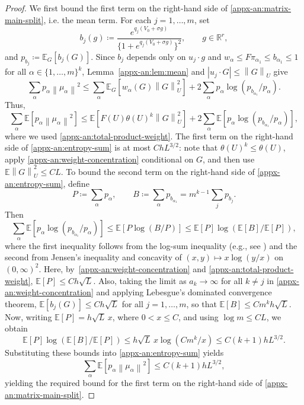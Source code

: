 \documentclass[11pt,letterpaper]{article}
\theoremstyle{remark}
\newcommand{\E}{\mathbb E}
\newcommand{\R}{\mathbb R}
\newcommand{\norm}[1]{\left\lVert#1\right\rVert}
\begin{document}
\begin{proof}
We first bound the first term on the right-hand side of \eqref{appx-an:matrix-main-split}, i.e. the mean term.
For each $j=1,\dots, m$, set
\[
 b_j(g)\coloneqq
 \frac{e^{q_j(V_0+\sigma g)}}
 {\{1+e^{q_j(V_0+\sigma g)}\}^2},
 \qquad g\in\R^r,
 \]
 and \(p_{b_j}\coloneqq\E_G[b_j(G)]\).
Since $b_j$ depends only on $u_j\cdot g$ and
$w_\alpha\le F\pi_{\alpha_1}\le b_{\alpha_1}\leq 1$ for all $\alpha\in\{1,\dots, m\}^k$,
Lemma~\ref{appx-an:lem:mean} and
$|u_j\cdot G|\le\norm G_U$ give
\[
 \sum_\alpha p_\alpha\norm{\mu_\alpha}^2
 \le \sum_{\alpha}\E_G[w_{\alpha}(G)\norm G_U^2]
 +2\sum_\alpha p_\alpha
 \log(p_{b_{\alpha_1}}/p_\alpha).
\] 
Thus,
\begin{equation}
\sum_\alpha \E[p_\alpha\norm{\mu_\alpha}^2]
 \le \E[F(U)\theta(U)^k\norm G_U^2]
 +2\sum_\alpha \E[p_\alpha
 \log(p_{b_{\alpha_1}}/p_\alpha)],
 \label{appx-an:entropy-sum}
\end{equation}
where we used \eqref{appx-an:total-product-weight}.  The first term on the right-hand side of \eqref{appx-an:entropy-sum} is at most
$ChL^{3/2}$: note that $\theta(U)^k \leq \theta(U)$, apply
\eqref{appx-an:weight-concentration} conditional on $G$, and then use $\E\norm G_U^2\le CL$.
To bound the second term on the right-hand side of \eqref{appx-an:entropy-sum}, 
define
\[
 P\coloneqq\sum_\alpha p_\alpha,\qquad
 B\coloneqq\sum_\alpha p_{b_{\alpha_1}}
 =m^{k-1}\sum_j p_{b_j}.
\]
Then
\[
 \sum_\alpha \E [p_\alpha
 \log(p_{b_{\alpha_1}}/p_\alpha)]
 \le \E[P\log(B/P)]
 \le \E[P]\log(\E[B]/\E[P]),
\]
where the first inequality follows from the log-sum inequality (e.g., see \cite[Theorem~2.7.1]{CoverThomas2006}) and the second from Jensen's inequality and concavity of $(x,y)\mapsto x\log(y/x)$ on $(0,\infty)^2$.
Here, by~\eqref{appx-an:weight-concentration} and \eqref{appx-an:total-product-weight}, $\E[P] \le Ch\sqrt L$. Also, taking the limit as $a_k\to\infty$ for all $k\neq j$ in \eqref{appx-an:weight-concentration} and applying Lebesgue's dominated convergence theorem, $\E[b_j(G)] \leq Ch\sqrt L$ for all $j=1,\dots, m$, so that  $\E[B] \le Cm^kh\sqrt L$.
Now, writing $\E[P] =h\sqrt L\,x$, where $0<x\le C$,
and using $\log m\le CL$, we obtain
\[
 \E[P]\log(\E[B]/\E[P])
 \le h\sqrt L\,x\log(Cm^k/x)
 \le C(k+1)hL^{3/2}.
\]
Substituting these bounds into \eqref{appx-an:entropy-sum} yields
\begin{equation}
  \sum_\alpha \E[p_\alpha\norm{\mu_\alpha}^2]
 \le C(k+1)hL^{3/2},
 \label{appx-an:tilted-mean-bound}
\end{equation}
yielding the required bound for the first term on the right-hand side of \eqref{appx-an:matrix-main-split}.


\end{proof}
\end{document}
